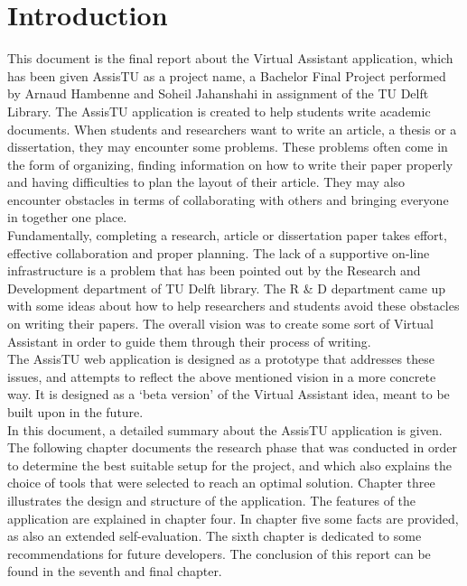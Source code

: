 \chapter{Introduction}

This document is the final report about the Virtual Assistant application, which has been given AssisTU as a project name, a Bachelor Final Project performed by Arnaud Hambenne and Soheil Jahanshahi in assignment of the TU Delft Library. The AssisTU application is created to help students write academic documents. When students and researchers want to write an article, a thesis or a dissertation, they may encounter some problems. These problems often come in the form of organizing, finding information on how to write their paper properly and having difficulties to plan the layout of their article. They may also encounter obstacles in terms of collaborating with others and bringing everyone in together one place. \\

Fundamentally, completing a research, article or dissertation paper takes effort, effective collaboration and proper planning. The lack of a supportive on-line infrastructure is a problem that has been pointed out by the Research and Development department of TU Delft library. The R \& D department came up with some ideas about how to help researchers and students avoid these obstacles on writing their papers. The overall vision was to create some sort of Virtual Assistant in order to guide them through their process of writing.\\

The AssisTU web application is designed as a prototype that addresses these issues, and attempts to reflect the above mentioned vision in a more concrete way. It is designed as a `beta version' of the Virtual Assistant idea, meant to be built upon in the future.\\ 

In this document, a detailed summary about the AssisTU application is given. The following chapter documents the research phase that was conducted in order to determine the best suitable setup for the project, and which also explains the choice of tools that were selected to reach an optimal solution. 
Chapter three illustrates the design and structure of the application. The features of the application are explained in chapter four. In chapter five some facts are provided, as also an extended self-evaluation. The sixth chapter is dedicated to some recommendations for future developers. The conclusion of this report can be found in the seventh and final chapter. 